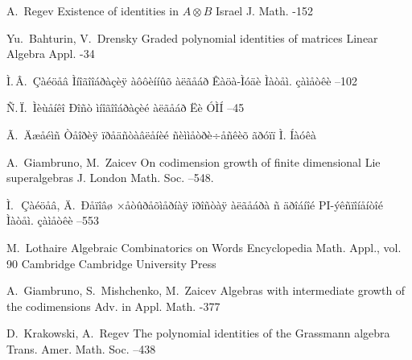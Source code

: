 \documentclass{article}
\numberwithin{equation}{section}
\theoremstyle{plain}
\theoremstyle{definition}
\begin{document}
\begin{thebibliography}{99}
\by A.~Regev
\paper Existence of identities in $A\otimes B$
\jour Israel J. Math.
-152

\by Yu.~Bahturin, V.~Drensky
\paper Graded polynomial identities of matrices 
\jour Linear Algebra Appl. 
-34

\by Ì.\,Â.~Çàéöåâ
\paper Ìíîãîîáðàçèÿ àôôèííûõ àëãåáð Êàöà-Ìóäè
\jour Ìàòåì. çàìåòêè
--102

\by Ñ.\,Ï.~Ìèùåíêî
\paper Ðîñò ìíîãîîáðàçèé àëãåáð Ëè
\jour ÓÌÍ
--45

\by Ã.~Äæåéìñ 
\book Òåîðèÿ ïðåäñòàâëåíèé ñèììåòðè÷åñêèõ ãðóïï   
\publaddr Ì.
\publ Íàóêà

\by A.~Giambruno,  M.~Zaicev
\paper On codimension growth of finite dimensional Lie superalgebras
\jour J. London Math. Soc.
--548.

\by Ì.\,~Çàéöåâ, Ä.~Ðåïîâø 
\paper ×åòûðåõìåðíàÿ ïðîñòàÿ àëãåáðà ñ äðîáíîé PI-ýêñïîíåíòîé
\jour Ìàòåì. çàìåòêè
--553

\by M.~Lothaire
\book Algebraic Combinatorics on Words 
\bookinfo Encyclopedia Math. Appl., vol. 90
\publaddr Cambridge
\publ Cambridge University Press

\by A.~Giambruno, S.~Mishchenko, M.~Zaicev
\paper Algebras with intermediate growth of the codimensions
\jour Adv. in Appl. Math. 
-377

\by D.~Krakowski, A.~Regev
\paper The polynomial identities of the Grassmann algebra
\jour Trans. Amer. Math. Soc.
--438

\end{thebibliography}
\end{document}
